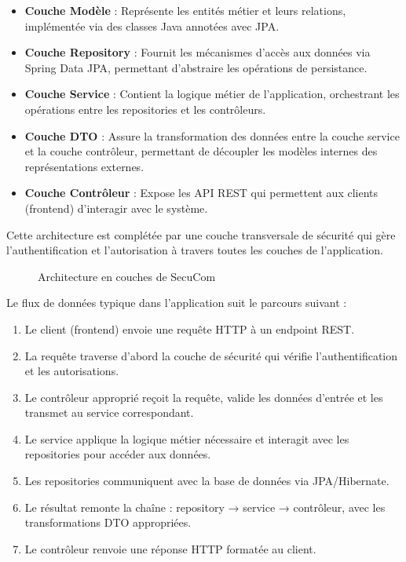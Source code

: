 \documentclass[12pt,a4paper]{report}
\begin{document}
\begin{itemize}
  \item \textbf{Couche Modèle} : Représente les entités métier et leurs relations, implémentée via des classes Java annotées avec JPA.
  \item \textbf{Couche Repository} : Fournit les mécanismes d'accès aux données via Spring Data JPA, permettant d'abstraire les opérations de persistance.
  \item \textbf{Couche Service} : Contient la logique métier de l'application, orchestrant les opérations entre les repositories et les contrôleurs.
  \item \textbf{Couche DTO} : Assure la transformation des données entre la couche service et la couche contrôleur, permettant de découpler les modèles internes des représentations externes.
  \item \textbf{Couche Contrôleur} : Expose les API REST qui permettent aux clients (frontend) d'interagir avec le système.
\end{itemize}

Cette architecture est complétée par une couche transversale de sécurité qui gère l'authentification et l'autorisation à travers toutes les couches de l'application.

\begin{figure}[h]
\centering
\caption{Architecture en couches de SecuCom}
\end{figure}

Le flux de données typique dans l'application suit le parcours suivant :

\begin{enumerate}
  \item Le client (frontend) envoie une requête HTTP à un endpoint REST.
  \item La requête traverse d'abord la couche de sécurité qui vérifie l'authentification et les autorisations.
  \item Le contrôleur approprié reçoit la requête, valide les données d'entrée et les transmet au service correspondant.
  \item Le service applique la logique métier nécessaire et interagit avec les repositories pour accéder aux données.
  \item Les repositories communiquent avec la base de données via JPA/Hibernate.
  \item Le résultat remonte la chaîne : repository → service → contrôleur, avec les transformations DTO appropriées.
  \item Le contrôleur renvoie une réponse HTTP formatée au client.
\end{enumerate}
\end{document}
